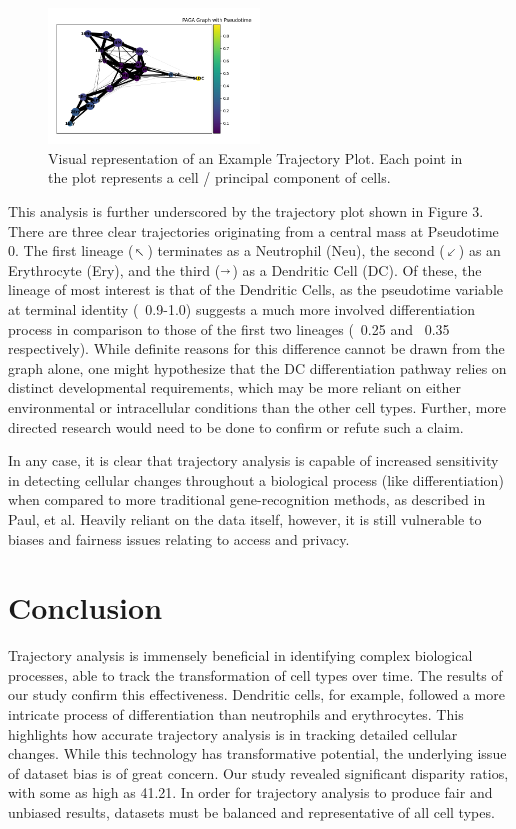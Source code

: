 \documentclass{article}
\makeatletter
\newcommand{\fixed@sra}{$\vrule height 2\fontdimen22\textfont2 width 0pt\shortrightarrow$}
\newcommand{\shortarrow}[1]{%
  \mathrel{\text{\rotatebox[origin=c]{\numexpr#1*45}{\fixed@sra}}}%
}
\makeatother
\begin{document}
\begin{figure}[h]
\centering
\includegraphics[width=0.5\textwidth]{./images/paga_graph_pseudotime.png}
\caption{Visual representation of an Example Trajectory Plot. Each point in the plot represents a cell / principal component of cells.}
\end{figure}


This analysis is further underscored by the trajectory plot shown in Figure 3. There are three clear trajectories originating from a central mass at Pseudotime 0. The first lineage ($\shortarrow{3}$) terminates as a Neutrophil (Neu), the second ($\shortarrow{5}$) as an Erythrocyte (Ery), and the third ($\shortarrow{0}$) as a Dendritic Cell (DC). Of these, the lineage of most interest is that of the Dendritic Cells, as the pseudotime variable at terminal identity (~0.9-1.0) suggests a much more involved differentiation process in comparison to those of the first two lineages (~0.25 and ~0.35 respectively). While definite reasons for this difference cannot be drawn from the graph alone, one might hypothesize that the DC differentiation pathway relies on distinct developmental requirements, which may be more reliant on either environmental or intracellular conditions than the other cell types. Further, more directed research would need to be done to confirm or refute such a claim.

In any case, it is clear that trajectory analysis is capable of increased sensitivity in detecting cellular changes throughout a biological process (like differentiation) when compared to more traditional gene-recognition methods, as described in Paul, et al. Heavily reliant on the data itself, however, it is still vulnerable to biases and fairness issues relating to access and privacy.


\section{Conclusion}
Trajectory analysis is immensely beneficial in identifying complex biological processes, able to track the transformation of cell types over time.  The results of our study confirm this effectiveness.  Dendritic cells, for example, followed a more intricate process of differentiation than neutrophils and erythrocytes.  This highlights how accurate trajectory analysis is in tracking detailed cellular changes.  While this technology has transformative potential, the underlying issue of dataset bias is of great concern.  Our study revealed significant disparity ratios, with some as high as 41.21.  In order for trajectory analysis to produce fair and unbiased results, datasets must be balanced and representative of all cell types.
\end{document}
